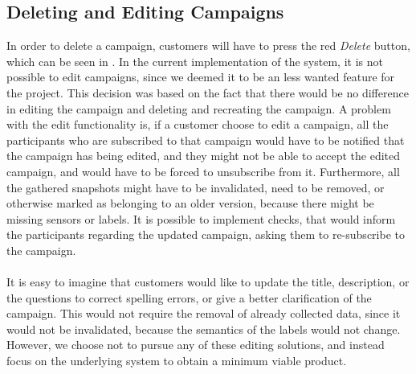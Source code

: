 
\FloatBarrier

\subsection{Deleting and Editing Campaigns}
\label{sub:editing_and_deleting_campaigns}
In order to delete a campaign, customers will have to press the red \emph{Delete} button, which can be seen in . In the current implementation of the system, it is not possible to edit campaigns, since we deemed it to be an less wanted feature for the project. This decision was based on the fact that there would be no difference in editing the campaign and deleting and recreating the campaign. A problem with the edit functionality is, if a customer choose to edit a campaign, all the participants who are subscribed to that campaign would have to be notified that the campaign has being edited, and they might not be able to accept the edited campaign, and would have to be forced to unsubscribe from it. Furthermore, all the gathered snapshots might have to be invalidated, need to be removed, or otherwise marked as belonging to an older version, because there might be missing sensors or labels. It is possible to implement checks, that would inform the participants regarding the updated campaign, asking them to re-subscribe to the campaign. 
\\\\
It is easy to imagine that customers would like to update the title, description, or the questions to correct spelling errors, or give a better clarification of the campaign. This would not require the removal of already collected data, since it would not be invalidated, because the semantics of the labels would not change. However, we choose not to pursue any of these editing solutions, and instead focus on the underlying system to obtain a minimum viable product. 